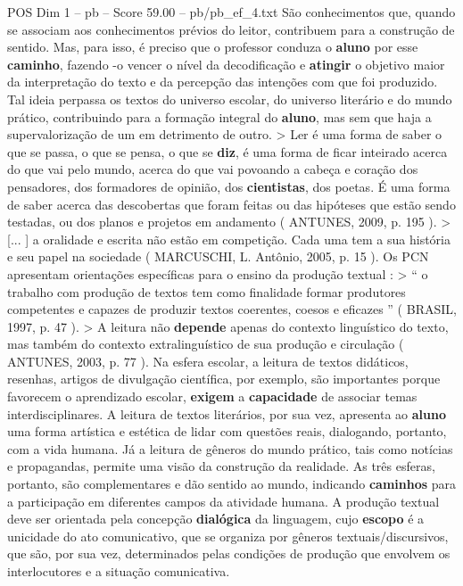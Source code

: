 \begin{textsample}{POS Dim 1 – pb – Score 59.00 – pb/pb\_ef\_4.txt}
São conhecimentos que, quando se associam aos conhecimentos prévios do leitor, contribuem para a construção de sentido.
Mas, para isso, é preciso que o professor conduza o \textbf{aluno} por esse \textbf{caminho}, fazendo -o vencer o nível da decodificação e \textbf{atingir} o objetivo maior da interpretação do texto e da percepção das intenções com que foi produzido.
Tal ideia perpassa os textos do universo escolar, do universo literário e do mundo prático, contribuindo para a formação integral do \textbf{aluno}, mas sem que haja a supervalorização de um em detrimento de outro. > Ler é uma forma de saber o que se passa, o que se pensa, o que se \textbf{diz}, é uma forma de ficar inteirado acerca do que vai pelo mundo, acerca do que vai povoando a cabeça e coração dos pensadores, dos formadores de opinião, dos \textbf{cientistas}, dos poetas.
É uma forma de saber acerca das descobertas que foram feitas ou das hipóteses que estão sendo testadas, ou dos planos e projetos em andamento ( ANTUNES, 2009, p. 195 ). > [... ] a oralidade e escrita não estão em competição.
Cada uma tem a sua história e seu papel na sociedade ( MARCUSCHI, L.
Antônio, 2005, p. 15 ).
Os PCN apresentam orientações específicas para o ensino da produção textual : > “ o trabalho com produção de textos tem como finalidade formar produtores competentes e capazes de produzir textos coerentes, coesos e eficazes ” ( BRASIL, 1997, p. 47 ). > A leitura não \textbf{depende} apenas do contexto linguístico do texto, mas também do contexto extralinguístico de sua produção e circulação ( ANTUNES, 2003, p. 77 ).
Na esfera escolar, a leitura de textos didáticos, resenhas, artigos de divulgação científica, por exemplo, são importantes porque favorecem o aprendizado escolar, \textbf{exigem} a \textbf{capacidade} de associar temas interdisciplinares.
A leitura de textos literários, por sua vez, apresenta ao \textbf{aluno} uma forma artística e estética de lidar com questões reais, dialogando, portanto, com a vida humana.
Já a leitura de gêneros do mundo prático, tais como notícias e propagandas, permite uma visão da construção da realidade.
As três esferas, portanto, são complementares e dão sentido ao mundo, indicando \textbf{caminhos} para a participação em diferentes campos da atividade humana.
A produção textual deve ser orientada pela concepção \textbf{dialógica} da linguagem, cujo \textbf{escopo} é a unicidade do ato comunicativo, que se organiza por gêneros textuais/discursivos, que são, por sua vez, determinados pelas condições de produção que envolvem os interlocutores e a situação comunicativa.

\end{textsample}
